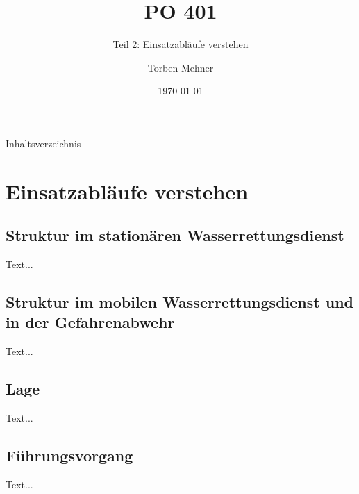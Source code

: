 \documentclass[notes]{beamer}
\title{PO 401}
\subtitle{Teil 2: Einsatzabläufe verstehen}
\author{Torben Mehner}
\institute{Bezirk Karlsruhe}
\date{\today}
\begin{document}
	
	
	\begin{frame}{Inhaltsverzeichnis}
		
		\tableofcontents[ 
		sectionstyle=hide, 
		subsectionstyle=show,]
		
	\end{frame}		
	
	\section{Einsatzabläufe verstehen}
	\subsection{Struktur im stationären Wasserrettungsdienst}
	\begin{frame}{\subsecname}
		
		Text...
		
	\end{frame}

	\subsection{Struktur im mobilen Wasserrettungsdienst und in der	Gefahrenabwehr}
	\begin{frame}{\subsecname}
		
		Text...
		
	\end{frame}
	
	\subsection{Lage}
	\begin{frame}{\subsecname}
		
		Text...
		
	\end{frame}

	\subsection{Führungsvorgang}
	\begin{frame}{\subsecname}
		
		Text...
		
	\end{frame}
\end{document}
